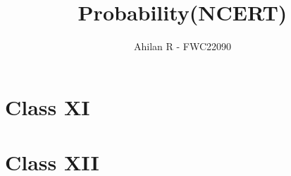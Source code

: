 \documentclass{article}
\begin{document}
\title{Probability(NCERT)}
\author{\Large Ahilan R - FWC22090}
\date{}

\maketitle

\section*{Class XI}


\section*{Class XII}


\end{document}
